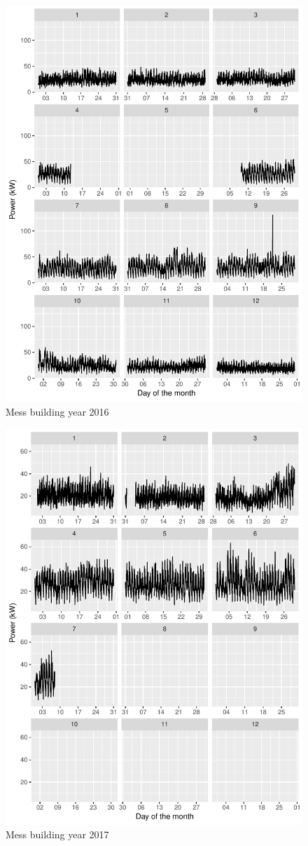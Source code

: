 \documentclass[11pt, oneside]{article}   	%
\begin{document}
\begin{figure}
\includegraphics[keepaspectratio]{mess_build_Y2016.pdf}
\caption{Mess building year 2016 }
\end{figure}
\begin{figure}
\includegraphics[keepaspectratio]{mess_build_Y2017.pdf}
\caption{Mess building year 2017 }
\end{figure}
\end{document}
